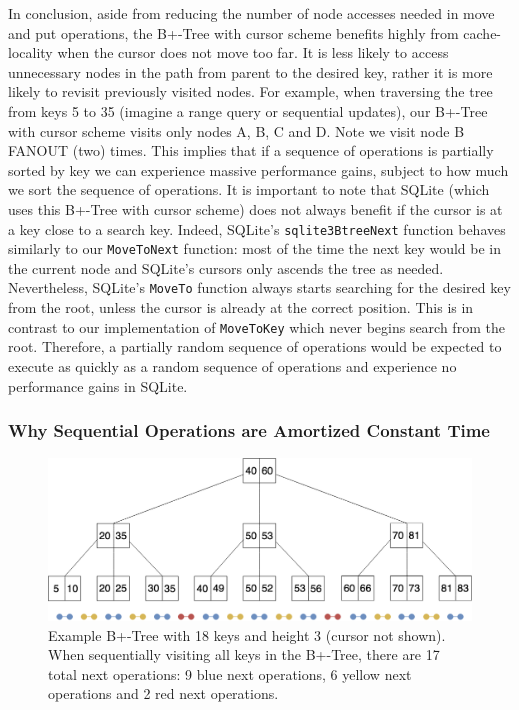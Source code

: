  
 

In conclusion, aside from reducing the number of node accesses needed in move and put operations, the B+-Tree with cursor scheme benefits highly from cache-locality when the cursor does not move too far. It is less likely to access unnecessary nodes in the path from parent to the desired key, rather it is more likely to revisit previously visited nodes. For example, when traversing the tree from keys 5 to 35 (imagine a range query or sequential updates), our B+-Tree with cursor scheme visits only nodes A, B, C and D. Note we visit node B FANOUT (two) times. This implies that if a sequence of operations is partially sorted by key we can experience massive performance gains, subject to how much we sort the sequence of operations. It is important to note that SQLite \cite{SQLite} (which uses this B+-Tree with cursor scheme) does not always benefit if the cursor is at a key close to a search key. Indeed, SQLite's \texttt{sqlite3BtreeNext} function behaves similarly to our \texttt{MoveToNext} function: most of the time the next key would be in the current node and SQLite's cursors only ascends the tree as needed. Nevertheless, SQLite's \texttt{MoveTo} function always starts searching for the desired key from the root, unless the cursor is already at the correct position. This is in contrast to our implementation of \texttt{MoveToKey} which never begins search from the root. Therefore, a partially random sequence of operations would be expected to execute as quickly as a random sequence of operations and experience no performance gains in SQLite. 

\subsubsection {Why Sequential Operations are Amortized Constant Time}

\begin{figure}[h]
    \centering
    \includegraphics[scale=0.30]{figures/amortizedtimenextexample.png}
    \caption{Example B+-Tree with 18 keys and height 3 (cursor not shown). When sequentially visiting all keys in the B+-Tree, there are 17 total next operations: 9 blue next operations, 6 yellow next operations and 2 red next operations.}
    \label{fig:amortizedanalysisheight3}
\end{figure}


